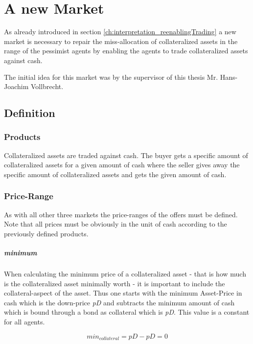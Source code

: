 \documentclass[Bachelorarbeit.tex]{subfiles}
\begin{document}
\graphicspath{{./figures/newMarket/}}	%

\chapter{A new Market}
\label{ch:newMarket}
As already introduced in section \ref{ch:interpretation_reenablingTrading} a new market is necessary to repair the miss-allocation of collateralized assets in the range of the pessimist agents by enabling the agents to trade collateralized assets against cash.

\medskip

The initial idea for this market was by the supervisor of this thesis Mr. Hans-Joachim Vollbrecht.

\section{Definition}
\subsection{Products}
Collateralized assets are traded against cash. The buyer gets a specific amount of collateralized assets for a given amount of cash where the seller gives away the specific amount of collateralized assets and gets the given amount of cash.

\subsection{Price-Range}
As with all other three markets the price-ranges of the offers must be defined. Note that all prices must be obviously in the unit of cash according to the previously defined products.

\paragraph{minimum}
When calculating the minimum price of a collateralized asset - that is how much is the collateralized asset minimally worth - it is important to include the collateral-aspect of the asset. Thus one starts with the minimum Asset-Price in cash which is the down-price \textit{pD} and subtracts the minimum amount of cash which is bound through a bond as collateral which is \textit{pD}. This value is a constant for all agents.

\begin{equation}
min_{collateral} = \textit{pD} - \textit{pD} = 0
\end{equation}
 
\end{document}
